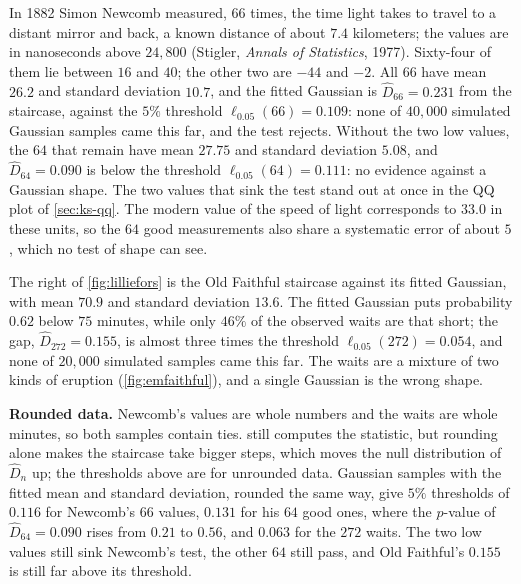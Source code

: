 \begin{worked}
In 1882 Simon Newcomb measured, $66$ times, the time light takes to travel to a distant mirror and back, a known distance of about $7.4$ kilometers; the values are in nanoseconds above $24{,}800$ (Stigler, \textit{Annals of Statistics}, 1977).
Sixty-four of them lie between $16$ and $40$; the other two are $-44$ and $-2$.
All $66$ have mean $26.2$ and standard deviation $10.7$, and the fitted Gaussian is $\hat{D}_{66} = 0.231$ from the staircase, against the $5\%$ threshold $\ell_{0.05}(66) = 0.109$: none of $40{,}000$ simulated Gaussian samples came this far, and the test rejects.
Without the two low values, the $64$ that remain have mean $27.75$ and standard deviation $5.08$, and $\hat{D}_{64} = 0.090$ is below the threshold $\ell_{0.05}(64) = 0.111$: no evidence against a Gaussian shape.
The two values that sink the test stand out at once in the QQ plot of \cref{sec:ks-qq}.
The modern value of the speed of light corresponds to $33.0$ in these units, so the $64$ good measurements also share a systematic error of about $5$, which no test of shape can see.
\end{worked}

The right of \cref{fig:lilliefors} is the Old Faithful staircase against its fitted Gaussian, with mean $70.9$ and standard deviation $13.6$.
The fitted Gaussian puts probability $0.62$ below $75$ minutes, while only $46\%$ of the observed waits are that short; the gap, $\hat{D}_{272} = 0.155$, is almost three times the threshold $\ell_{0.05}(272) = 0.054$, and none of $20{,}000$ simulated samples came this far.
The waits are a mixture of two kinds of eruption (\cref{fig:emfaithful}), and a single Gaussian is the wrong shape.

\textbf{Rounded data.}
Newcomb's values are whole numbers and the waits are whole minutes, so both samples contain ties.
 still computes the statistic, but rounding alone makes the staircase take bigger steps, which moves the null distribution of $\hat{D}_n$ up; the thresholds above are for unrounded data.
Gaussian samples with the fitted mean and standard deviation, rounded the same way, give $5\%$ thresholds of $0.116$ for Newcomb's $66$ values, $0.131$ for his $64$ good ones, where the $p$-value of $\hat{D}_{64} = 0.090$ rises from $0.21$ to $0.56$, and $0.063$ for the $272$ waits.
The two low values still sink Newcomb's test, the other $64$ still pass, and Old Faithful's $0.155$ is still far above its threshold.

